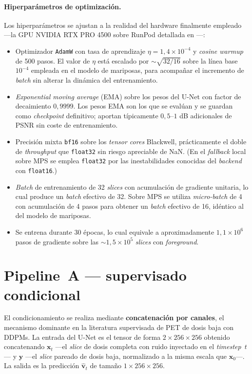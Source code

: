 \paragraph{Hiperparámetros de optimización.}
Los hiperparámetros se ajustan a la realidad del hardware
finalmente empleado —la GPU NVIDIA RTX PRO 4500 sobre RunPod
detallada en —:

\begin{itemize}[leftmargin=*]
    \item Optimizador \texttt{AdamW} con tasa de aprendizaje
    $\eta = 1{,}4 \times 10^{-4}$ y \textit{cosine warmup} de
    500 pasos. El valor de $\eta$ está escalado por
    $\sim\sqrt{32/16}$ sobre la línea base $10^{-4}$ empleada en
    el modelo de mariposas, para acompañar el incremento de
    \textit{batch} sin alterar la dinámica del entrenamiento.
    \item \textit{Exponential moving average} (EMA) sobre los
    pesos del U-Net con factor de decaimiento $0{,}9999$. Los
    pesos EMA son los que se evalúan y se guardan como
    \textit{checkpoint} definitivo; aportan típicamente $0{,}5$--$1$
    dB adicionales de PSNR sin coste de entrenamiento.
    \item Precisión mixta \texttt{bf16} sobre los \textit{tensor
    cores} Blackwell, prácticamente el doble de \textit{throughput}
    que \texttt{float32} sin riesgo apreciable de NaN. (En el
    \textit{fallback} local sobre MPS se emplea \texttt{float32}
    por las inestabilidades conocidas del \textit{backend} con
    \texttt{float16}.)
    \item \textit{Batch} de entrenamiento de 32 \textit{slices}
    con acumulación de gradiente unitaria, lo cual produce un
    \textit{batch} efectivo de 32. Sobre MPS se utiliza
    \textit{micro-batch} de 4 con acumulación de 4 pasos para
    obtener un \textit{batch} efectivo de 16, idéntico al del
    modelo de mariposas.
    \item Se entrena durante 30 épocas, lo cual equivale a
    aproximadamente $1{,}1 \times 10^{6}$ pasos de gradiente
    sobre las $\sim 1{,}5 \times 10^{5}$ \textit{slices} con
    \textit{foreground}.
\end{itemize}

\section{Pipeline~A — supervisado condicional}
\label{sec:pet-pipeline-a}

El condicionamiento se realiza mediante \textbf{concatenación por
canales}, el mecanismo dominante en la literatura supervisada de
PET de dosis baja con DDPMs. La entrada del U-Net es el tensor
de forma $2 \times 256 \times 256$ obtenido concatenando
$\mathbf{x}_t$ —el \textit{slice} de dosis completa con ruido
inyectado en el \textit{timestep}~$t$— y $\mathbf{y}$ —el
\textit{slice} pareado de dosis baja, normalizado a la misma
escala que $\mathbf{x}_0$—. La salida es la predicción
$\hat{\mathbf{v}}_t$ de tamaño $1 \times 256 \times 256$.


